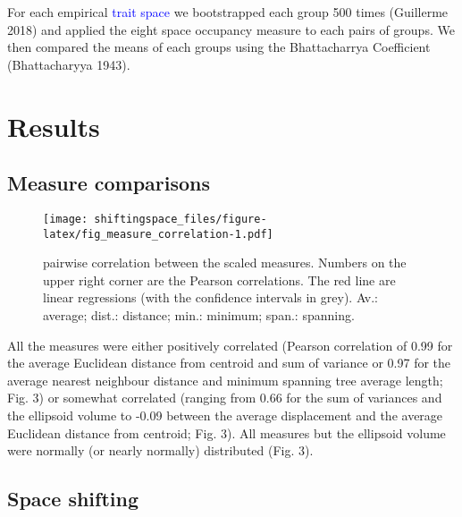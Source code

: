 \documentclass[]{article}
\begin{document}
\renewcommand\baselinestretch{1.6}\selectfont

For each empirical \textcolor{blue}{trait space} we
bootstrapped each group 500 times (Guillerme 2018) and applied the eight
space occupancy measure to each pairs of groups. We then compared the
means of each groups using the Bhattacharrya Coefficient (Bhattacharyya
1943).

\section{Results}\label{results}

\subsection{Measure comparisons}\label{measure-comparisons-1}

\renewcommand\baselinestretch{1}\selectfont


\begin{figure}
\centering
\texttt{[image: shiftingspace\_files/figure-latex/fig\_measure\_correlation-1.pdf]}
\caption{pairwise correlation between the scaled measures.
Numbers on the upper right corner are the Pearson correlations. The red
line are linear regressions (with the confidence intervals in grey).
Av.: average; dist.: distance; min.: minimum; span.: spanning.}
\end{figure}

\renewcommand\baselinestretch{1.6}\selectfont


All the measures were either positively correlated (Pearson correlation
of 0.99 for the average Euclidean distance from centroid and sum of
variance or 0.97 for the average nearest neighbour distance and minimum
spanning tree average length; Fig. 3) or somewhat correlated (ranging
from 0.66 for the sum of variances and the ellipsoid volume to -0.09
between the average displacement and the average Euclidean distance from
centroid; Fig. 3). All measures but the ellipsoid volume were normally
(or nearly normally) distributed (Fig. 3).

\subsection{Space shifting}\label{space-shifting}

\renewcommand\baselinestretch{1}\selectfont
\end{document}
